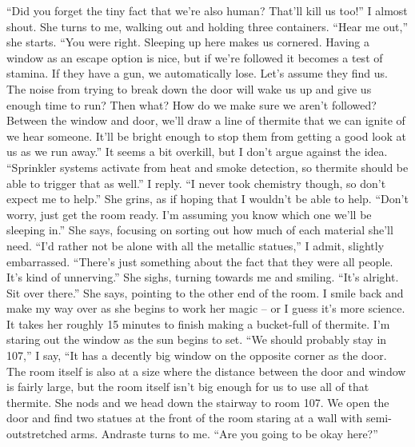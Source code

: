 \documentclass[a4paper, 12pt]{book}
\newcommand\tab[1][1cm]{\hspace*{#1}}
\begin{document}
\newline
\tab
“Did you forget the tiny fact that we’re also human? That’ll kill us too!” I almost shout. 
\newline
\tab
She turns to me, walking out and holding three containers. “Hear me out,” she starts. “You were right. Sleeping up here makes us cornered. Having a window as an escape option is nice, but if we’re followed it becomes a test of stamina. If they have a gun, we automatically lose. Let’s assume they find us. The noise from trying to break down the door will wake us up and give us enough time to run? Then what? How do we make sure we aren’t followed? Between the window and door, we’ll draw a line of thermite that we can ignite of we hear someone. It’ll be bright enough to stop them from getting a good look at us as we run away.” It seems a bit overkill, but I don’t argue against the idea.
\newline
\tab
“Sprinkler systems activate from heat and smoke detection, so thermite should be able to trigger that as well.” I reply. “I never took chemistry though, so don’t expect me to help.”
\newline
\tab
She grins, as if hoping that I wouldn’t be able to help. “Don’t worry, just get the room ready. I’m assuming you know which one we’ll be sleeping in.” She says, focusing on sorting out how much of each material she’ll need.
\newline
\tab
“I’d rather not be alone with all the metallic statues,” I admit, slightly embarrassed. “There’s just something about the fact that they were all people. It’s kind of unnerving.”
\newline
\tab
She sighs, turning towards me and smiling. “It’s alright. Sit over there.” She says, pointing to the other end of the room. I smile back and make my way over as she begins to work her magic – or I guess it’s more science. It takes her roughly 15 minutes to finish making a bucket-full of thermite. 
\newline
\tab
I’m staring out the window as the sun begins to set. “We should probably stay in 107,” I say, “It has a decently big window on the opposite corner as the door. The room itself is also at a size where the distance between the door and window is fairly large, but the room itself isn’t big enough for us to use all of that thermite.
\newline
\tab
She nods and we head down the stairway to room 107. We open the door and find two statues at the front of the room staring at a wall with semi-outstretched arms. Andraste turns to me. “Are you going to be okay here?” 
\end{document}
